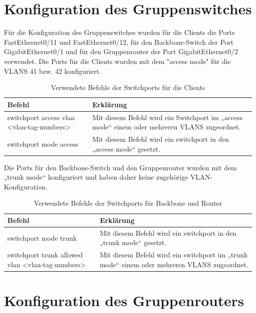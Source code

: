\documentclass{article}
\begin{document}
\pagebreak
\section{Konfiguration des Gruppenswitches}

Für die Konfiguration des Gruppenswitches wurden für die Clients die Ports FastEthernet0/11 und FastEthernet0/12, für den Backbone-Switch der Port GigabitEthernet0/1 und für den Gruppenrouter der Port GigabitEthernet0/2 verwendet.
Die Ports für die Clients wurden mit dem "access mode" für die VLANS 41 bzw. 42 konfiguriert.

\begin{table}[htbp]
    \centering
    \begin{tabularx}{\textwidth}{|X|X|}
        \toprule
        \textbf{Befehl} & \textbf{Erklärung} \\
        \midrule
        switchport access vlan <vlan-tag-numbers> & Mit diesem Befehl wird ein Switchport im „access mode“ einem oder mehreren VLANS zugeordnet.\\
        \hline
        switchport mode access & Mit diesem Befehl wird ein switchport in den „access mode“ gesetzt.\\
        \bottomrule
    \end{tabularx}
    \caption{Verwendete Befehle der Switchports für die Clients}
    \label{tab:commands}
\end{table}
\noindent Die Ports für den Backbone-Switch und den Gruppenrouter wurden mit dem „trunk mode“ konfiguriert und haben daher keine zugehörige VLAN-Konfiguration.

\begin{table}[htbp]
    \centering
    \begin{tabularx}{\textwidth}{|X|X|}
        \toprule
        \textbf{Befehl} & \textbf{Erklärung} \\
        \midrule
        switchport mode trunk & Mit diesem Befehl wird ein switchport in den „trunk mode“ gesetzt.\\
        \hline
         switchport trunk allowed vlan <vlan-tag-numbers> & Mit diesem Befehl wird ein switchport im „trunk mode“ einem oder mehreren VLANS zugeordnet.\\
        \bottomrule
    \end{tabularx}
    \caption{Verwendete Befehle der Switchports für Backbone und Router}
\end{table}

\section{Konfiguration des Gruppenrouters}
\end{document}
